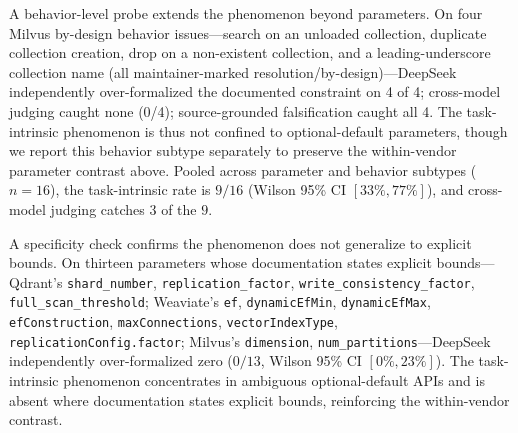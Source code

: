 \documentclass[sigconf]{acmart}
\begin{document}
A behavior-level probe extends the phenomenon beyond parameters. On four Milvus by-design behavior issues---search on an unloaded collection, duplicate collection creation, drop on a non-existent collection, and a leading-underscore collection name (all maintainer-marked resolution/by-design)---DeepSeek independently over-formalized the documented constraint on 4 of 4; cross-model judging caught none (0/4); source-grounded falsification caught all 4. The task-intrinsic phenomenon is thus not confined to optional-default parameters, though we report this behavior subtype separately to preserve the within-vendor parameter contrast above. Pooled across parameter and behavior subtypes ($n{=}16$), the task-intrinsic rate is $9/16$ (Wilson 95\% CI $[33\%, 77\%]$), and cross-model judging catches $3$ of the $9$.

A specificity check confirms the phenomenon does not generalize to explicit bounds. On thirteen parameters whose documentation states explicit bounds---Qdrant's \texttt{shard\_number}, \texttt{replication\_factor}, \texttt{write\_consistency\_factor}, \texttt{full\_scan\_threshold}; Weaviate's \texttt{ef}, \texttt{dynamicEfMin}, \texttt{dynamicEfMax}, \texttt{efConstruction}, \texttt{maxConnections}, \texttt{vectorIndexType}, \texttt{replicationConfig.factor}; Milvus's \texttt{dimension}, \texttt{num\_partitions}---DeepSeek independently over-formalized zero ($0/13$, Wilson 95\% CI $[0\%, 23\%]$). The task-intrinsic phenomenon concentrates in ambiguous optional-default APIs and is absent where documentation states explicit bounds, reinforcing the within-vendor contrast.
\end{document}

